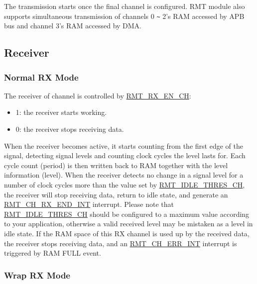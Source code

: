 \documentclass[main\_\_EN.tex]{subfiles}
\begin{document}
The transmission starts once the final channel is configured. RMT module also supports simultaneous transmission of channels 0 \verb+~+ 2's RAM accessed by APB bus and channel 3's RAM accessed by DMA.



\subsection{Receiver}

\subsubsection{Normal RX Mode}\label{sec:normal-rx-mode}

The receiver of channel  is controlled by \hyperref[fielddesc:RMTRXENCHM]{RMT\_RX\_EN\_CH}:
\begin{itemize}
    \item 1: the receiver starts working.
    \item 0: the receiver stops receiving data.
\end{itemize}

When the receiver becomes active, it starts counting from the first edge of the signal, detecting signal levels and counting clock cycles the level lasts for. Each cycle count (period) is then written back to RAM together with the level information (level). When the receiver detects no change in a signal level for a number of clock cycles more than the value set by \hyperref[fielddesc:RMTIDLETHRESCHM]{RMT\_IDLE\_THRES\_CH}, the receiver will stop receiving data, return to idle state, and generate an \hyperref[int:RMTCHnRXENDINT]{RMT\_CH\_RX\_END\_INT} interrupt. Please note that \hyperref[fielddesc:RMTIDLETHRESCHM]{RMT\_IDLE\_THRES\_CH} should be configured to a maximum value according to your application, otherwise a valid received level may be mistaken as a level in idle state. If the RAM space of this RX channel is used up by the received data, the receiver stops receiving data, and an \hyperref[int:RMTCHnERRINT]{RMT\_CH\_ERR\_INT} interrupt is triggered by RAM FULL event.


\subsubsection{Wrap RX Mode}
\end{document}
